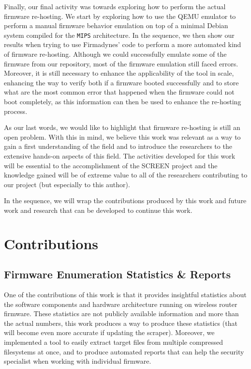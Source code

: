 Finally, our final activity was towards exploring how to perform the actual firmware re-hosting. We start by exploring how to use the QEMU emulator to perform a manual firmware behavior emulation on top of a minimal Debian system compiled for the {\tt MIPS} architecture. In the sequence, we then show our results when trying to use Firmadynes' code to perform a more automated kind of firmware re-hosting. Although we could successfully emulate some of the firmware from our repository, most of the firmware emulation still faced errors. Moreover, it is still necessary to enhance the applicability of the tool in scale, enhancing the way to verify both if a firmware booted successfully and to store what are the most common error that happened when the firmware could not boot completely, as this information can then be used to enhance the re-hosting process.

As our last words, we would like to highlight that firmware re-hosting is still an open problem. With this in mind, we believe this work was relevant as a way to gain a first understanding of the field and to introduce the researchers to the extensive hands-on aspects of this field. The activities developed for this work will be essential to the accomplishment of the SCREEN project and the knowledge gained will be of extreme value to all of the researchers contributing to our project (but especially to this author).

In the sequence, we will wrap the contributions produced by this work and future work and research that can be developed to continue this work.

\section{Contributions}

\subsection{Firmware Enumeration Statistics \& Reports}
One of the contributions of this work is that it provides insightful statistics about the software components and hardware architecture running on wireless router firmware. These statistics are not publicly available information and more than the actual numbers, this work produces a way to produce these statistics (that will become even more accurate if updating the scraper). Moreover, we implemented a tool to easily extract target files from multiple compressed filesystems at once, and to produce automated reports that can help the security specialist when working with individual firmware.

